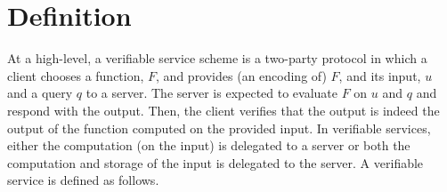 
\section{Definition}\label{Definition}

At a high-level, a verifiable service scheme is a two-party protocol in which a client chooses a function, $F$, and provides (an encoding of) $F$, and its input, $u$ and a query $q$ to a server.  The server is expected to evaluate $F$ on $u$ and $q$ and respond with the output. Then, the client  verifies that the output is indeed the output of the function computed on the provided input. In verifiable services, either the computation (on the input) is delegated to a server or both the computation and storage of the input is delegated to the server. A verifiable service is defined as follows. 


